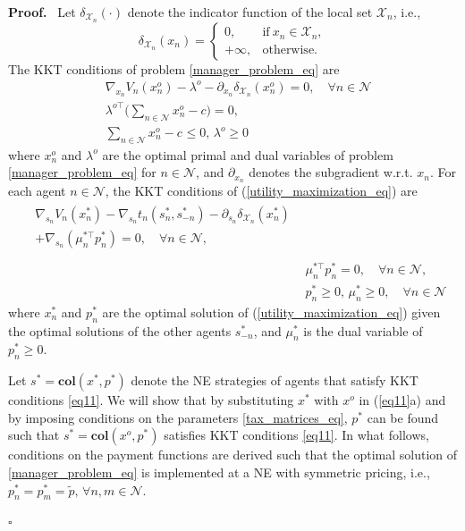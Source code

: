 \documentclass[twocolumn]{autart}
\newenvironment{proof}[1][Proof]{%
  \par\noindent\textbf{#1.}\ }{%
  \hfill$\square$\par
}
\begin{document}
\begin{proof}
Let $\delta_{\mathcal{X}_n}(\cdot)$ denote the indicator function of the local set $\mathcal{X}_n$, i.e.,
     \[\delta_{\mathcal{X}_n}(x_n)=\begin{cases}
         0,&\text{if} \ x_n\in\mathcal{X}_n,\\
         +\infty,&\text{otherwise}.
     \end{cases}
     \]
 The KKT conditions of problem \eqref{manager_problem_eq} are
		\begin{subequations}\label{eq10}
			\begin{align}
				& \nabla_{x_n} V_n(x_n^o)-\lambda^o-\partial_{x_n} \delta_{\mathcal{X}_n}(x_n^o)=0, \quad \forall n\in\mathcal{N}\\
			  & \lambda^{o\top}\bigg(\sum_{n\in\mathcal{N}}{x_n^{o}}-c\bigg)=0,\\
                & \sum_{n\in\mathcal{N}}{x_n^{o}}-c^{}\leq 0, \,\lambda^{o}\geq 0
			\end{align}
		\end{subequations}
		where $x_n^o$ and $\lambda^o$ are the optimal primal and dual variables of problem \eqref{manager_problem_eq} for $n\in \mathcal{N}$, and $\partial_{x_n}$ denotes the subgradient w.r.t. $x_n$. For each agent $n\in\mathcal{N}$, the KKT conditions of (\ref{utility_maximization_eq}) are
		\begin{subequations}\label{eq11}
			\begin{align}
			\begin{split}
			&\nabla_{s_n} V_n(x_n^*) -\nabla_{s_n}t_n(s_n^*, s_{-n}^*)-\partial_{s_n} \delta_{\mathcal{X}_n}(x_n^*)\\
			&+\nabla_{s_n}(\mu_n^{*\top}p_n^*)=0, \quad \forall n\in\mathcal{N},\\
			\end{split}\\
                & \mu_n^{*\top}p_n^{*}=0, \quad \forall n\in\mathcal{N},\\
                & p_n^{*}\geq 0, \, \mu_n^{*}\geq 0, \quad  \forall n\in\mathcal{N}
		  \end{align}
		\end{subequations}
		where $x_n^*$ and $p_n^*$ are the optimal solution of (\ref{utility_maximization_eq}) given the optimal solutions of the other agents $s_{-n}^*$, and $\mu_n^*$ is the dual variable of $p_n^*\geq 0$. 
 \par
 Let $s^*=\textbf{col}(x^*, p^*)$ denote the NE strategies of agents that satisfy KKT conditions \eqref{eq11}. We will show that by substituting $x^*$ with $x^o$ in (\ref{eq11}a) and by imposing conditions on the parameters \eqref{tax_matrices_eq}, $p^*$ can be found such that $s^*=\textbf{col}(x^o, p^*)$ satisfies KKT conditions \eqref{eq11}. In what follows, conditions on the payment functions are derived such that the optimal solution of \eqref{manager_problem_eq} is implemented at a NE with symmetric pricing,  
 i.e.,  
 $p_n^*=p_{m}^*=\tilde{p}, \, \forall n,{m}\in\mathcal{N}$.
 

\end{proof}
\end{document}
